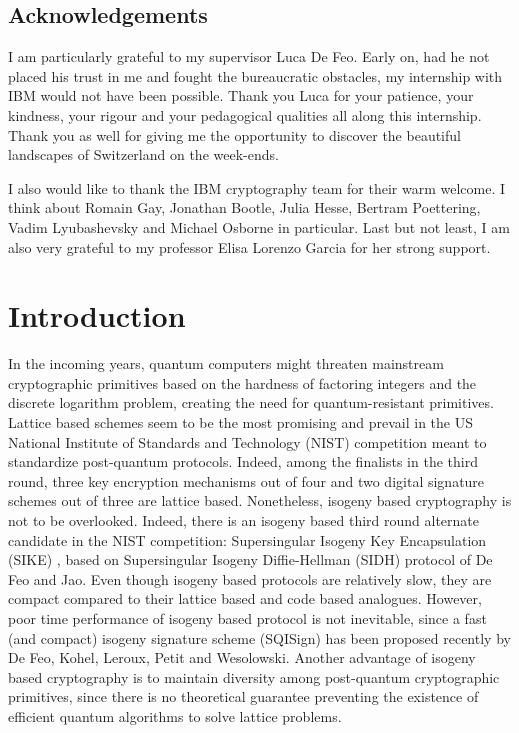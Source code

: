 \documentclass[a4paper,10pt,notitlepage]{report}
\theoremstyle{definition}
\theoremstyle{plain}
\theoremstyle{definition}
\renewcommand{\(}{\left(}
\renewcommand{\)}{\right)}
\begin{document}
\newpage

\tableofcontents

\newpage

\section*{Acknowledgements}

I am particularly grateful to my supervisor Luca De Feo.  Early on, had he not placed his trust in me and fought the bureaucratic obstacles, my internship with IBM would not have been possible. Thank you Luca for your patience, your kindness, your rigour and your pedagogical qualities all along this internship. Thank you as well for giving me the opportunity to discover the beautiful landscapes of Switzerland on the week-ends.

I also would like to thank the IBM cryptography team for their warm welcome. I think about Romain Gay, Jonathan Bootle, Julia Hesse, Bertram Poettering, Vadim Lyubashevsky and Michael Osborne in particular. Last but not least, I am also very grateful to my professor Elisa Lorenzo Garcia for her strong support.


\chapter*{Introduction}

In the incoming years, quantum computers might threaten mainstream cryptographic primitives based on the hardness of factoring integers and the discrete logarithm problem, creating the need for quantum-resistant primitives. Lattice based schemes seem to be the most promising and prevail in the US National Institute of Standards and Technology (NIST) competition meant to standardize post-quantum protocols. Indeed, among the finalists in the third round, three key encryption mechanisms out of four and two digital signature schemes out of three are lattice based. Nonetheless, isogeny based cryptography is not to be overlooked. Indeed, there is an isogeny based third round alternate candidate in the NIST competition: Supersingular Isogeny Key Encapsulation (SIKE) \cite{SIKE}, based on Supersingular Isogeny Diffie-Hellman (SIDH) protocol \cite{DeFeoSIDH} of De Feo and Jao.  Even though isogeny based protocols are relatively slow, they are compact compared to their lattice based and code based analogues. However, poor time performance of isogeny based protocol is not inevitable, since a fast (and compact) isogeny signature scheme (SQISign) \cite{SQISign} has been proposed recently by De Feo, Kohel, Leroux, Petit and Wesolowski. Another advantage of isogeny based cryptography is to maintain diversity among post-quantum cryptographic primitives, since there is no theoretical guarantee preventing the existence of efficient quantum algorithms to solve lattice problems.
\end{document}
